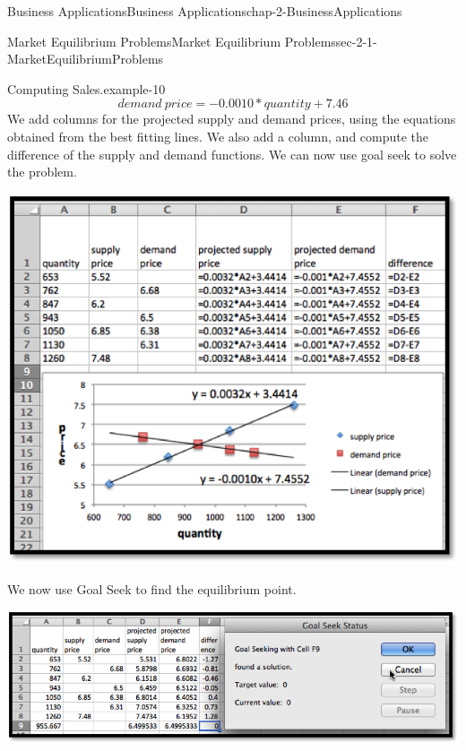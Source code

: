 \documentclass[oneside,10pt,]{book}
\numberwithin{equation}{section}
\begin{document}
\begin{chapterptx}{Business Applications}{}{Business Applications}{}{}{chap-2-BusinessApplications}
\begin{sectionptx}{Market Equilibrium Problems}{}{Market Equilibrium Problems}{}{}{sec-2-1-MarketEquilibriumProblems}
\begin{example}{Computing Sales.}{example-10}
%
\begin{equation*}
demand\ price=-0.0010*quantity+7.46
\end{equation*}
\hypertarget{p-581}{}%
We add columns for the projected supply and demand prices, using the equations obtained from the best fitting lines.  We also add a column, and compute the difference of the supply and demand functions. We can now use goal seek to solve the problem. \leavevmode%
\begin{sidebyside}{1}{0.2}{0.2}{0}%
\begin{sbspanel}{0.6}%
\includegraphics[width=1\linewidth]{images/sec2-1-9.png}
\end{sbspanel}%
\end{sidebyside}%
%
\par
\hypertarget{p-582}{}%
We now use Goal Seek to find the equilibrium point. \leavevmode%
\begin{sidebyside}{1}{0.1}{0.1}{0}%
\begin{sbspanel}{0.8}%
\includegraphics[width=1\linewidth]{images/sec2-1-10.png}
\end{sbspanel}%
\end{sidebyside}%

\end{example}
\end{sectionptx}
\end{chapterptx}
\end{document}
